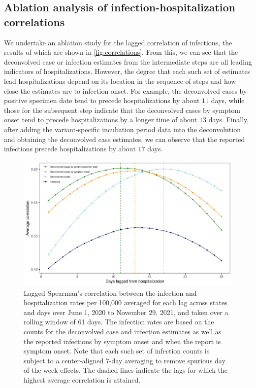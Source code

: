 \documentclass{article}
\begin{document}
\subsection{Ablation analysis of infection-hospitalization correlations}

We undertake an ablation study for the lagged correlation of infections, the
results of which are shown in \autoref{fig:correlations}. From
this, we can see that the deconvolved case or infection estimates from the
intermediate steps are all leading indicators of hospitalizations. However, the
degree that each such set of estimates lead hospitalizations depend on its
location in the sequence of steps and how close the estimates are to infection
onset. For example, the deconvolved cases by positive specimen date tend to
precede hospitalizations by about $11$ days, while those for the subsequent step
indicate that the deconvolved cases by symptom onset tend to precede
hospitalizations by a longer time of about $13$ days. Finally, after adding the
variant-specific incubation period data into the deconvolution and obtaining the
deconvolved case estimates, we can observe that the reported infections precede
hospitalizations by about $17$ days. 

\begin{figure}[!tb]
\centering
    \includegraphics[width=.8\textwidth]{adj_unadj_pi_no_inc_hosp_lag_corr_F24.pdf} 
    \caption{Lagged Spearman's correlation between the infection and
    hospitalization rates per 100,000 averaged for each lag across \US states
    and days over June 1, 2020 to November 29, 2021, and taken over a rolling
    window of 61 days. The infection rates are based on the counts for the
    deconvolved case and infection estimates as well as the reported infections
    by symptom onset and when the report is symptom onset. Note that each such
    set of infection counts is subject to a center-aligned 7-day averaging to
    remove spurious day of the week effects. The dashed lines indicate the lags
    for which the highest average correlation is attained.}
    \label{fig:adj_unadj_sym_hosp_lag_corr}
\end{figure}
\end{document}

